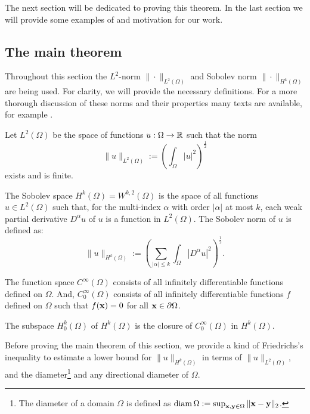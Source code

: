 The next section will be dedicated to proving this theorem. In the last section we will provide some examples of and motivation for our work.


\subsection{The main theorem} \label{sec:main_theorem}

Throughout this section the $L^2$-norm $\|\cdot\|_{L^2(\Omega)}$ and Sobolev norm $\|\cdot\|_{H^k(\Omega)}$ are being used. For clarity, we will provide the necessary definitions. For a more thorough discussion of these norms and their properties many texts are available, for example \cite{adams_sobolev_2003}.

Let $L^2(\Omega)$ be the space of functions $u : \Omega \to \mathbb{R}$ such that the norm
$$
  \|u\|_{L^2(\Omega)} := \left(\int_\Omega \left| u \right|^2 \right)^{\frac{1}{2}}
$$
exists and is finite.

The Sobolev space $ H^k(\Omega) = W^{k, 2}(\Omega) $ is the space of all functions $u \in L^2(\Omega)$ such that, for the multi-index $\alpha$ with order $|\alpha|$ at most $k$, each weak partial derivative $D^\alpha u$ of $u$ is a function in $L^2(\Omega)$. The Sobolev norm of $u$ is defined as:
$$
  \|u\|_{H^k(\Omega)} := \left(\sum_{|\alpha| \leq k} \int_\Omega \left| D^\alpha u \right|^2\right)^{\frac{1}{2}}\text{.}
$$

The function space $C^\infty(\Omega)$ consists of all infinitely differentiable functions defined on $\Omega$. And, $C_0^\infty(\Omega)$ consists of all infinitely differentiable functions $f$ defined on $\Omega$ such that $f(\vb{x}) = 0$ for all $\vb{x} \in \partial\Omega$.

The subspace $ H^k_0(\Omega)$ of $H^k(\Omega)$ is the closure of $C_0^\infty(\Omega)$ in $H^k(\Omega)$.

Before proving the main theorem of this section, we provide a kind of Fried\-richs's inequality to estimate a lower bound for $\| u \|_{H^k(\Omega)}$ in terms of $\| u \|_{L^2(\Omega)}$, and the diameter\footnote{The diameter of a domain $\Omega$ is defined as $\operatorname{diam}\Omega := \sup_{\vb{x},\vb{y}\in \Omega} \|\vb{x} - \vb{y}\|_2$.} and any directional diameter of $\Omega$.

